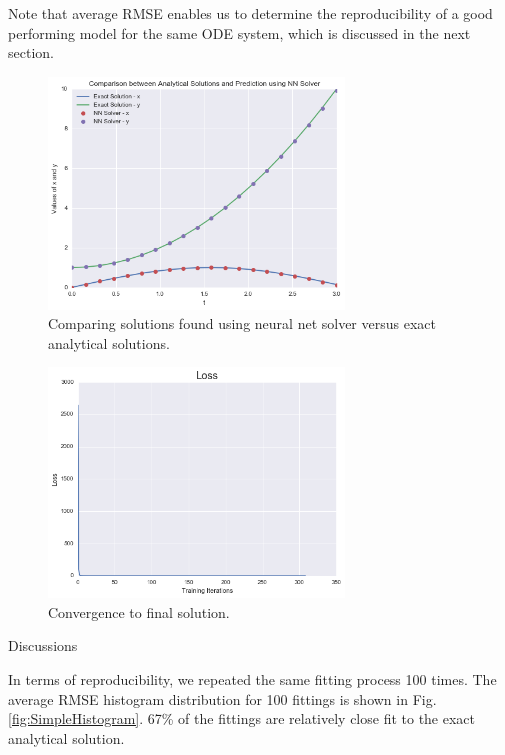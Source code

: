 \documentclass[11pt]{article}
\begin{document}
Note that average RMSE enables us to determine the reproducibility of a good performing model for the same ODE system, which is discussed in the next section. 

\begin{figure}
\centering
\includegraphics[width=0.7\textwidth]{result_simple.png}
      \caption{Comparing solutions found using neural net solver versus exact analytical solutions.\label{fig:SimpleFig}}
\end{figure}

\begin{figure}
\centering
\includegraphics[width=0.7\textwidth]{loss_simple.png}
      \caption{Convergence to final solution. \label{fig:SimpleLoss}}
\end{figure}

Discussions

In terms of reproducibility, we repeated the same fitting process 100 times. The average RMSE histogram distribution for 100 fittings is shown in Fig. \ref{fig:SimpleHistogram}. 67\% of the fittings are relatively close fit to the exact analytical solution.
\end{document}

